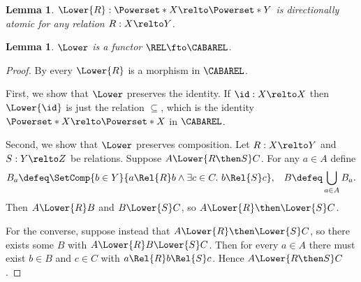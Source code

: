 \documentclass[10pt,a4paper]{article}
\newtheorem{lemma}[theorem]{Lemma}
\begin{document}
\begin{lemma}\label{lemma:lower-then-cabarel}
   \(\Lower{R} : \Powerset*{X} \relto \Powerset*{Y}\) is directionally atomic
   for any relation \(R : X \relto Y\).
\end{lemma}
%
%
%

\begin{lemma}\label{lemma:lower-functor}
  \(\Lower\) is a functor \(\REL \fto \CABAREL\).
\end{lemma}
\begin{proof}

  By  every \(\Lower{R}\) is a morphism in
  \(\CABAREL\).

  First, we show that \(\Lower\) preserves the identity. If \(\id : X \relto X\)
  then \(\Lower{\id}\) is just the relation \(\subseteq\), which is the identity
  \(\Powerset*{X} \relto \Powerset*{X}\) in \(\CABAREL\).

  Second, we show that \(\Lower\) preserves composition. Let \(R : X \relto Y\)
  and \(S : Y \relto Z\) be relations. Suppose \(A \Lower{R \then S} C\). For
  any \(a \in A\) define
  \begin{align*}
    B_a \defeq
    \SetComp{b \in Y}{a \Rel{R} b \wedge \exists c \in C.\ b \Rel{S} c},
    &&
       B \defeq \bigcup_{a \in A} B_a.
  \end{align*}
  Then $A \Lower{R} B$ and $B \Lower{S} C$, so
  \(A \Lower{R} \then \Lower{S} C\).

  For the converse, suppose instead that \(A \Lower{R} \then \Lower{S} C\), so
  there exists some \(B\) with \(A \Lower{R} B \Lower{S} C\). Then for every
  \(a \in A\) there must exist \(b \in B\) and \(c \in C\) with
  \(a \Rel{R} b \Rel{S} c\). Hence \(A \Lower{R \then S} C\).
\end{proof}
\end{document}
